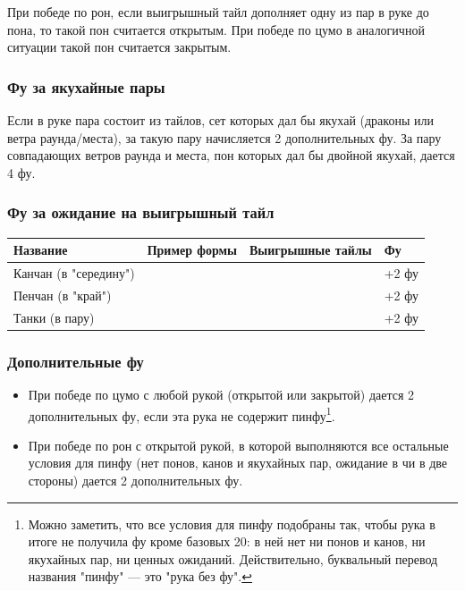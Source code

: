 При победе по рон, если выигрышный тайл дополняет одну из пар в руке до пона, то такой пон считается открытым. При победе по цумо в аналогичной ситуации такой пон считается закрытым.

\subsubsection{Фу за якухайные пары}

Если в руке пара состоит из тайлов, сет которых дал бы якухай (драконы или ветра раунда/места), за такую пару начисляется 2 дополнительных фу. За пару совпадающих ветров раунда и места, пон которых дал бы двойной якухай, дается 4 фу.

\subsubsection{Фу за ожидание на выигрышный тайл}

\noindent\begin{tabular}{C{3cm}C{5cm}C{3cm}C{3cm}}
\toprule
	Название  &
	Пример формы &
	Выигрышные тайлы &
	Фу \\
\midrule
		\rule[0ex]{0pt}{5ex} Канчан \newline (в "середину") \newline &
	 &
	 &
	+2 фу \\
\midrule
	\rule[0ex]{0pt}{5ex} Пенчан \newline (в "край") \newline &
	 &
	 &
	+2 фу \\
\midrule
	\rule[0ex]{0pt}{5ex} Танки \newline (в пару) \newline &
	 &
	 &
	+2 фу \\
\bottomrule
\end{tabular}

\subsubsection{Дополнительные фу}

\begin{itemize}
	\item При победе по цумо с любой рукой (открытой или закрытой) дается 2 дополнительных фу, если эта рука не содержит пинфу\footnote{Можно заметить, что все условия для пинфу подобраны так, чтобы рука в итоге не получила фу кроме базовых 20: в ней нет ни понов и канов, ни якухайных пар, ни ценных ожиданий. Действительно, буквальный перевод названия "пинфу" --- это "рука без фу".}.
	\item При победе по рон с открытой рукой, в которой выполняются все остальные условия для пинфу (нет понов, канов и якухайных пар, ожидание в чи в две стороны) дается 2 дополнительных фу.
\end{itemize}

